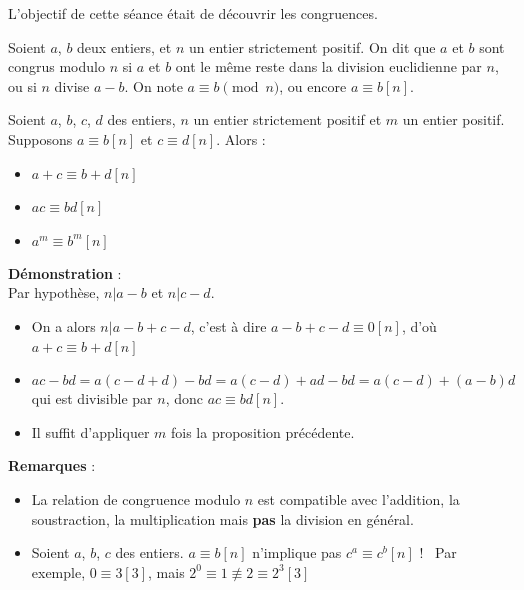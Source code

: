 L'objectif de cette séance était de découvrir les congruences.

\smallskip

\begin{dfn}
Soient $a$, $b$ deux entiers, et $n$ un entier strictement positif. On dit que $a$ et $b$ sont congrus modulo $n$ si $a$ et $b$ ont le même reste dans la division euclidienne par $n$, ou si $n$ divise $a - b$.
On note $a \equiv b \pmod{n}$, ou encore $a \equiv b [n]$.
\end{dfn}
\smallskip


\begin{pro}
Soient $a$, $b$, $c$, $d$ des entiers, $n$ un entier strictement positif et $m$ un entier positif. Supposons $a \equiv b [n]$ et $c \equiv d [n]$. Alors :
\begin{itemize}
    \item $a + c \equiv b + d [n]$\
    \item $ac \equiv bd [n]$\
    \item $a^m\equiv b^m [n]$
\end{itemize}
\end{pro}
\smallskip

\textbf{Démonstration} :\\
Par hypothèse, $n|a-b$ et $n|c-d$.
\begin{itemize}
    \item On a alors $n|a-b+c-d$, c'est à dire $a-b+c-d\equiv 0[n]$, d'où $a+c\equiv b+d [n]$\
    \item $ac - bd = a(c - d + d) - bd = a(c - d) + ad - bd = a(c - d) + (a - b)d$ qui est divisible par $n$, donc $ac \equiv bd [n]$.\
    \item Il suffit d'appliquer $m$ fois la proposition précédente.\
\end{itemize}

\bigskip

\textbf{Remarques} :
\begin{itemize}
    \item La relation de congruence modulo $n$ est compatible avec l’addition, la soustraction, la multiplication mais \textbf{pas} la division en général.\
    \item Soient $a$, $b$, $c$ des entiers.
    \newline
    $a\equiv b[n]$ n'implique pas $c^a\equiv c^b[n]$ !\
    \newline
    Par exemple, $0\equiv 3[3]$, mais $2^0\equiv 1\not\equiv 2\equiv 2^3[3]$
\end{itemize}

